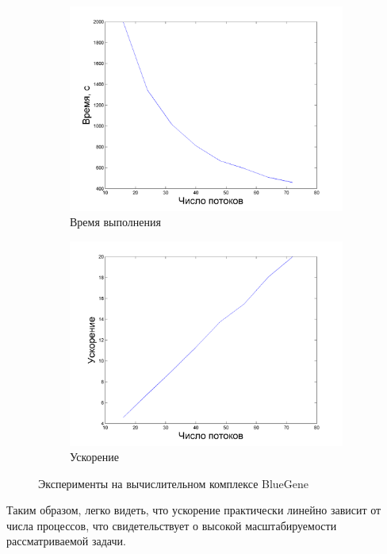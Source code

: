 \documentclass[a4paper,12pt]{report}
\begin{document}
	\begin{figure}[H]
			\begin{subfigure}{0.5\textwidth}
				\includegraphics[width=\textwidth]{mpi_bg.png}
				\caption{Время выполнения}
			\end{subfigure}
			\begin{subfigure}{0.5\textwidth}
				\includegraphics[width=\textwidth]{mpi_bg_speedup.png}
				\caption{Ускорение}
			\end{subfigure}
			\caption{Эксперименты на вычислительном комплексе BlueGene}
			\label{bg}
		\end{figure}\par


	\par Таким образом, легко видеть, что ускорение практически линейно зависит от числа процессов, что свидетельствует о  высокой масштабируемости рассматриваемой задачи.
\end{document}
